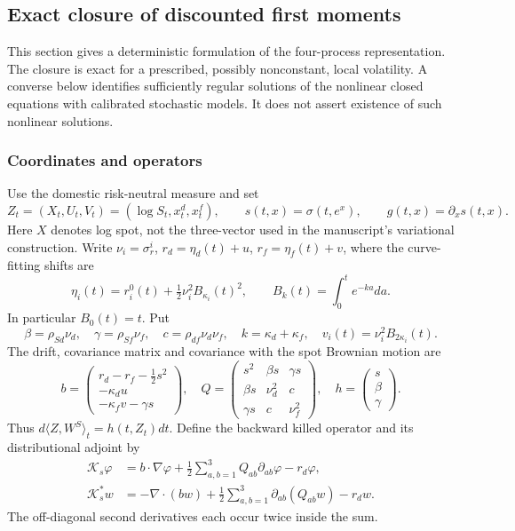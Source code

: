 \subsection{Exact closure of discounted first moments}\label{subsec: momentClosure}
This section gives a deterministic formulation of the four-process
representation. The closure is exact for a prescribed, possibly nonconstant,
local volatility. A converse below identifies sufficiently regular solutions
of the nonlinear closed equations with calibrated stochastic models. It does
not assert existence of such nonlinear solutions.

\subsubsection{Coordinates and operators}
Use the domestic risk-neutral measure and set
\[
Z_t=(X_t,U_t,V_t)=(\log S_t,x_t^d,x_t^f),\qquad
s(t,x)=\sigma(t,e^x),\qquad g(t,x)=\partial_xs(t,x).
\]
Here $X$ denotes log spot, not the three-vector used in the manuscript's
variational construction. Write $\nu_i=\sigma_r^i$, $r_d=\eta_d(t)+u$,
$r_f=\eta_f(t)+v$, where the curve-fitting shifts are
\[
\eta_i(t)=r_i^0(t)+\tfrac12\nu_i^2 B_{\kappa_i}(t)^2,
\qquad B_k(t)=\int_0^t e^{-ka}da.
\]
In particular $B_0(t)=t$. Put
\[
\beta=\rho_{Sd}\nu_d,\quad \gamma=\rho_{Sf}\nu_f,\quad
c=\rho_{df}\nu_d\nu_f,\quad k=\kappa_d+\kappa_f,\quad
v_i(t)=\nu_i^2 B_{2\kappa_i}(t).
\]
The drift, covariance matrix and covariance with the spot Brownian motion are
\begin{equation}\label{eq: closureState}
b=\begin{pmatrix}r_d-r_f-\tfrac12s^2\\-\kappa_du\\-\kappa_fv-\gamma s\end{pmatrix},
\quad Q=\begin{pmatrix}s^2&\beta s&\gamma s\\\beta s&\nu_d^2&c\\\gamma s&c&\nu_f^2\end{pmatrix},
\quad h=\begin{pmatrix}s\\\beta\\\gamma\end{pmatrix}.
\end{equation}
Thus $d\langle Z,W^S\rangle_t=h(t,Z_t)dt$. Define the backward killed operator
and its distributional adjoint by
\begin{align}
\mathcal K_s\varphi&=b\cdot\nabla\varphi+
\tfrac12\sum_{a,b=1}^3Q_{ab}\partial_{ab}\varphi-r_d\varphi,
\label{eq: closureOperator}\\
\mathcal K_s^*w&=-\nabla\cdot(bw)+
\tfrac12\sum_{a,b=1}^3\partial_{ab}(Q_{ab}w)-r_dw.\nonumber
\end{align}
The off-diagonal second derivatives each occur twice inside the sum.

